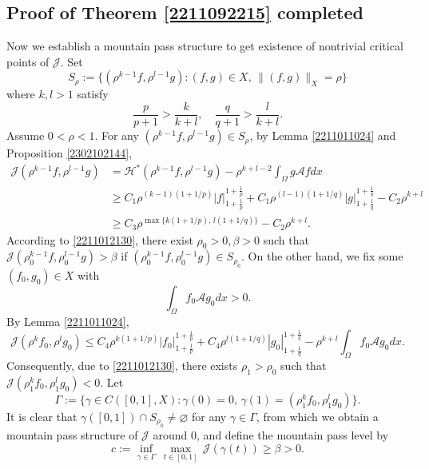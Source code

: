 \documentclass[10pt]{article}
\numberwithin{equation}{section}
\numberwithin{equation}{section}
\begin{document}
\subsection{Proof of Theorem \ref{2211092215} completed}
Now we establish a mountain pass structure to get existence of nontrivial critical points of $\mathcal{J}$. Set
$$S_\rho:=\{(\rho^{k-1}f, \rho^{l-1}g): (f, g)\in X, \,\|(f, g)\|_X=\rho\}$$
where $k, l>1$ satisfy
\begin{equation}\label{2211012130}
\frac{p}{p+1}>\frac{k}{k+l}, \quad \frac{q}{q+1}>\frac{l}{k+l}.
\end{equation}
Assume $0<\rho<1$. For any $(\rho^{k-1}f, \rho^{l-1}g)\in S_\rho$, by Lemma \ref{2211011024} and Proposition \ref{2302102144},
\[
\begin{split}
\mathcal{J}(\rho^{k-1}f, \rho^{l-1}g)& =\mathcal{H}^*(\rho^{k-1}f, \rho^{l-1}g)-\rho^{k+l-2}\int_{\Omega}g\mathcal{A}f dx\\
& \ge C_1 \rho^{(k-1)(1+1/p)}|f|_{1+\frac1p}^{1+\frac1p}+C_1\rho^{(l-1)(1+1/q)}|g|_{1+\frac1q}^{1+\frac1q}-C_2\rho^{k+l}\\
& \ge C_3\rho^{\max\{k(1+1/p),\, l(1+1/q)\}}-C_2\rho^{k+l}.
\end{split}
\]
According to \eqref{2211012130}, there exist $\rho_0 > 0, \beta>0$ such that $\mathcal{J}(\rho_0^{k-1}f, \rho_0^{l-1}g)>\beta$ if $(\rho_0^{k-1}f, \rho_0^{l-1}g)\in S_{\rho_0}$. 
On the other hand, we fix some $(f_0, g_0)\in X$ with $$\int_{\Omega}f_0\mathcal{A}g_0 dx>0.$$ By Lemma \ref{2211011024},
\[
\mathcal{J}(\rho^{k}f_0, \rho^{l}g_0)\le C_4 \rho^{k(1+1/p)}|f_0|_{1+\frac1p}^{1+\frac1p}+C_4\rho^{l(1+1/q)} |g_0|_{1+\frac1q}^{1+\frac1q}-\rho^{k+l}\int_{\Omega}f_0\mathcal{A}g_0 dx.
\]
Consequently, due to \eqref{2211012130}, there exists $\rho_1>\rho_0$ such that $\mathcal{J}(\rho_1^{k}f_0, \rho_1^{l}g_0)<0$. Let
\[
\Gamma:=\{\gamma\in C([0, 1], X): \gamma(0)=0,\, \gamma(1)=(\rho_1^{k}f_0, \rho_1^{l}g_0) \}.
\]
It is clear that $\gamma([0, 1])\cap S_{\rho_0}\neq \varnothing$ for any $\gamma\in \Gamma$, from which we obtain a mountain pass structure of $\mathcal{J}$ around 0, and define the mountain pass level by
\[
c:=\underset{\gamma\in \Gamma}{\inf}\,\underset{t\in [0, 1]}{\max}\, \mathcal{J}(\gamma(t))\ge \beta>0.
\]
\end{document}
